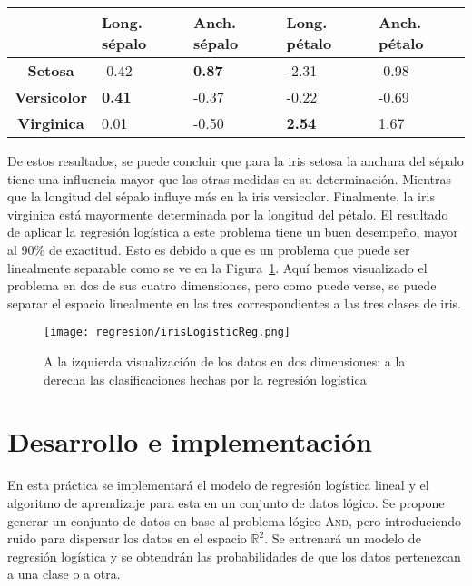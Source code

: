 \begin{center}
        \begin{tabular}{ c | l l l l }
          ~ & \textbf{Long. sépalo} & \textbf{Anch. sépalo} & \textbf{Long. pétalo} & \textbf{Anch. pétalo}\\ \hline
          \textbf{Setosa} & -0.42 & \textbf{0.87} & -2.31 & -0.98 \\
	\textbf{Versicolor} & \textbf{0.41} & -0.37 & -0.22 & -0.69 \\
	\textbf{Virginica}  & 0.01 & -0.50 & \textbf{2.54} & 1.67 \\ \hline
        \end{tabular}
    \end{center}

De estos resultados, se puede concluir que para la iris setosa la anchura del sépalo tiene una influencia mayor que las otras medidas en su determinación. Mientras que la longitud del sépalo influye más en la iris versicolor. Finalmente, la iris virginica está mayormente determinada por la longitud del pétalo. El resultado de aplicar la regresión logística a este problema tiene un buen desempeño, mayor al 90\% de exactitud. Esto es debido a que es un problema que puede ser linealmente separable como se ve en la Figura~\ref{Fig:irisLogisticReg}. Aquí hemos visualizado el problema en dos de sus cuatro dimensiones, pero como puede verse, se puede separar el espacio linealmente en las tres correspondientes a las tres clases de iris.

\begin{figure}
 \centering
 \texttt{[image: regresion/irisLogisticReg.png]}
 \caption{A la izquierda visualización de los datos en dos dimensiones; a la derecha las clasificaciones hechas por la regresión logística}\label{Fig:irisLogisticReg}
\end{figure} 




\section{Desarrollo e implementación}

En esta práctica se implementará el modelo de regresión logística lineal y el algoritmo de aprendizaje para esta en un conjunto de datos lógico. Se propone generar un conjunto de datos en base al problema lógico \textsc{And}, pero introduciendo ruido para dispersar los datos en el espacio $\mathbb{R}^2$. Se entrenará un modelo de regresión logística y se obtendrán las probabilidades de que los datos pertenezcan a una clase o a otra.



